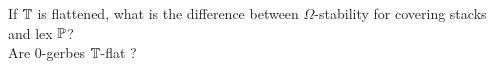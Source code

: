 \begin{question}
	If $\mathbb{T}$ is flattened, what is the difference between $\Omega$-stability for covering stacks and lex $\mathbb{P}$? \\
	Are 0-gerbes $\mathbb{T}$-flat ?
\end{question}


%	

%
%	

